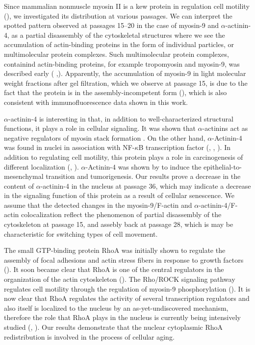 \documentclass[alpha-refs]{wiley-article}
\begin{document}
Since mammalian nonmuscle myosin II is a kew protein in regulation cell motility (\cite{shutova2018mammalian}), we investigated its distribution at various passages.
We can interpret the spotted pattern observed at passages 15--20 in the case of myosin-9 and $\alpha$-actinin-4, as a partial disassembly of the cytoskeletal structures where we see the accumulation of actin-binding proteins in the form of individual particles, or multimolecular protein complexes.
Such multimolecular protein complexes, containind actin-binding proteins, for example tropomyosin and myosin-9, was described early (\cite{grenklo2008tropomyosin} ,\cite{bobkov2017effect}).
Apparently, the accumulation of myosin-9 in light molecular weight fractions after gel filtration, which we observe at passage 15, is due to the fact that the protein is in the assembly-incompetent form (\cite{vicente2009non}), which is also consistent with immunofluorescence data shown in this work.

$\alpha$-actinin-4 is interesting in that, in addition to well-characterized structural functions, it plays a role in cellular signaling.
It was shown that $\alpha$-actinins act as negative regulators of myosin stack formation \cite{hu2019reciprocal}.
On the other hand, $\alpha$-Actinin-4 was found in nuclei in association with NF-$\kappa$B transcription factor (\cite{bolshakova2007extra}, \cite{babakov2008rela}, \cite{lomert2018co}).
In addition to regulating cell motility, this protein plays a role in carcinogenesis of different localization (\cite{barbolina2008motility}, \cite{hsu2013alpha}).
$\alpha$-Actinin-4 was shown by \cite{an2016alpha} to induce the epithelial-to-mesenchymal transition and tumorigenesis.
Our results prove a decrease in the content of $\alpha$-actinin-4 in the nucleus at passage 36, which may indicate a decrease in the signaling function of this protein as a result of cellular senescence.
We assume that the detected changes in the myosin-9/F-actin and $\alpha$-actinin-4/F-actin colocalization reflect the phenomenon of partial disassembly of the cytoskeleton at passage 15, and assebly back at passage 28, which is may be characteristic for switching types of cell movement.

The small GTP-binding protein RhoA was initially shown to regulate the
assembly of focal adhesions and actin stress fibers in response to growth
factors (\cite{ridley1992small}).
It soon became clear that RhoA is one of the central regulators in the organization of the actin cytoskeleton (\cite{burridge2004rho}).
The Rho/ROCK signaling pathway regulates cell motility through the regulation of myosin-9 phosphorylation (\cite{elliott2015myosin}).
It is now clear that RhoA regulates the activity of several transcription regulators and also itself is localized to the nucleus by an as-yet-undiscovered mechanism, therefore the role that RhoA plays in the nucleus is currently being intensively studied (\cite{guilluy2011analysis}, \cite{kim2018regulation}).
Our results demonstrate that the nuclear cytoplasmic RhoA redistribution is involved in the process of cellular aging.
\end{document}
